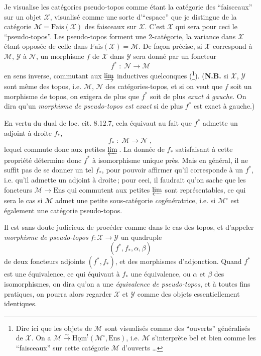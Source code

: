 \documentclass[11pt]{article}
\newcommand{\printedpage}[1]{\if\relax\detokenize{#1}\relax\else\marginpar{\footnotesize p.~#1}\fi}
\newcommand{\msp}[1]{\marginpar{\footnotesize [#1]}}
\newcommand{\uHom}{\underline{\mathrm{Hom}}}
\newcommand{\Ens}{\mathrm{Ens}}
\newcommand{\Fais}{\mathrm{Fais}}
\begin{document}
Je visualise les catégories pseudo-topos comme étant la catégorie des “faisceaux” sur un objet $\mathcal{X}$, visualisé comme une sorte d'“espace” que je distingue de la catégorie $\mathcal{M}=\Fais(\mathcal{X})$ des faisceaux sur $\mathcal{X}$. C'est $\mathcal{X}$ qui sera pour ceci le “pseudo-topos”. Les pseudo-topos forment une 2-catégorie, la variance dans $\mathcal{X}$ étant opposée de celle dans $\Fais(\mathcal{X})=\mathcal{M}$. De façon précise, si $\mathcal{X}$ correspond à $\mathcal{M}$, $\mathcal{Y}$ à $\mathcal{N}$, un morphisme $f$ de $\mathcal{X}$ dans $\mathcal{Y}$ sera donné par un foncteur
\[
f^* \;:\; \mathcal{N} \longrightarrow \mathcal{M}
\tag*{(4.1.1)}
\]
en sens inverse, commutant aux $\varinjlim$ inductives quelconques (\footnote{Dire ici que les objets de $\mathcal{M}$ sont visualisés comme des “ouverts” généralisés de $\mathcal{X}$. On a $\mathcal{M}\xrightarrow{\sim}\uHom^!(\mathcal{M}^\circ,\Ens)$, i.e. $\mathcal{M}$ s'interprète bel et bien comme les “faisceaux” sur cette catégorie $\mathcal{M}$ d'ouverts \ldots}). (\textbf{N.B.} si $\mathcal{X}$, $\mathcal{Y}$ sont même des topos, i.e. $\mathcal{M}$, $\mathcal{N}$ des catégories-topos, et si on veut que $f$ soit un morphisme de topos, on exigera de plus que $f^*$ soit de plus \textit{exact à gauche}. On dira qu'un \textit{morphisme de pseudo-topos est exact} si de plus $f^*$ est exact à gauche.)

\msp{page 52}
En vertu du dual de loc. cit. 8.12.7, cela équivaut au fait que $f^*$ admette un adjoint à droite $f_*$,
\[
f_* \;:\; \mathcal{M} \longrightarrow \mathcal{N}\;,
\tag*{(4.1.2)}
\]
lequel commute donc aux petites $\varprojlim$\,. La donnée de $f_*$ satisfaisant à cette propriété détermine donc $f^*$ à isomorphisme unique près. Mais en général, il ne suffit pas de se donner un tel $f_*$, pour pouvoir affirmer qu'il corresponde à un $f^*$, i.e. qu'il admette un adjoint à droite\,; pour ceci, il faudrait qu'on sache que les foncteurs $\mathcal{M}\longrightarrow\Ens$ qui commutent aux petites $\varprojlim$ sont représentables, ce qui sera le cas si $\mathcal{M}$ admet une petite sous-catégorie \textit{co}génératrice, i.e. si $\mathcal{M}^\circ$ est également une catégorie pseudo-topos. %

\newpage

\printedpage{2}

Il est sans doute judicieux de procéder comme dans le cas des topos, et d'appeler \textit{morphisme de pseudo-topos} $f:\mathcal{X}\longrightarrow\mathcal{Y}$ un quadruple
\[
(f^*,f_*,\alpha,\beta)
\tag*{(4.1.3)}
\]
\msp{page 53}
de deux foncteurs adjoints $(f^*,f_*)$, et des morphismes d'adjonction. Quand $f^*$ est une équivalence, ce qui équivaut à $f_*$ une équivalence, ou $\alpha$ et $\beta$ des isomorphismes, on dira qu'on a une \textit{équivalence de pseudo-topos}, et à toutes fins pratiques, on pourra alors regarder $\mathcal{X}$ et $\mathcal{Y}$ comme des objets essentiellement identiques.
\end{document}
